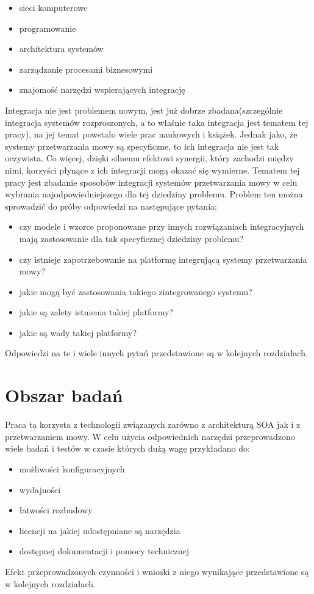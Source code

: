  \begin{itemize}
	\item sieci komputerowe
	\item programowanie
	\item architektura systemów
	\item zarządzanie procesami biznesowymi
	\item znajomość narzędzi wspierających integrację
\end{itemize}   
Integracja nie jest problemem nowym, jest już dobrze zbadana(szczególnie integracja systemów rozproszonych, a to właśnie taka integracja jest tematem tej pracy), na jej temat powstało wiele prac naukowych i książek. Jednak jako, że systemy przetwarzania mowy są specyficzne, to ich integracja nie jest tak oczywista. Co więcej, dzięki silnemu efektowi synergii, który zachodzi między nimi, korzyści płynące z ich integracji mogą okazać się wymierne. Tematem tej pracy jest zbadanie sposobów integracji systemów przetwarzania mowy w celu wybrania najodpowiedniejszego dla tej dziedziny problemu. Problem ten można sprowadzić do próby odpowiedzi na następujące pytania:
 \begin{itemize}
	\item  czy modele i wzorce proponowane przy innych rozwiązaniach integracyjnych mają zastosowanie dla tak specyficznej dziedziny problemu?
	\item czy istnieje zapotrzebowanie na platformę integrującą systemy przetwarzania mowy?
	\item jakie mogą być zastosowania takiego zintegrowanego systemu?
	\item jakie są zalety istnienia takiej platformy?
	\item jakie są wady takiej platformy?
\end{itemize}  
Odpowiedzi na te i wiele innych pytań przedstawione są w kolejnych rozdziałach.

\section{Obszar badań} %
Praca ta korzysta z technologii związanych zarówno z architekturą SOA jak i z przetwarzaniem mowy. W celu użycia odpowiednich narzędzi przeprowadzono wiele badań i testów w czasie których dużą wagę przykładano do:
\begin{itemize}
 	\item możliwości konfiguracyjnych
	\item wydajności
	\item łatwości rozbudowy
	\item licencji na jakiej udostępniane są narzędzia
	\item dostępnej dokumentacji i pomocy technicznej
\end{itemize}
Efekt przeprowadzonych czynności i wnioski z niego wynikające przedstawione są w kolejnych rozdziałach.


